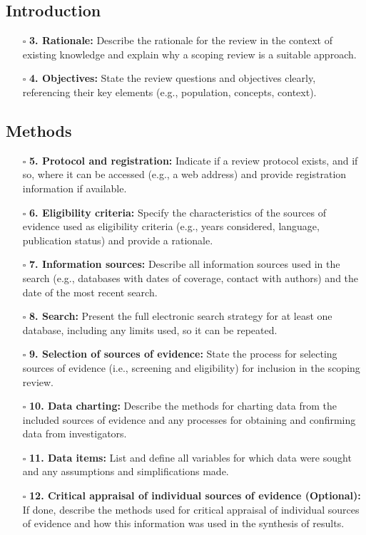 \documentclass[11pt]{article}
\def\tightlist{}
\begin{document}
\begin{Form}
\subsection{Introduction}\label{introduction}

\begin{itemize}
\tightlist
\item[$\square$]
  \textbf{3. Rationale:} Describe the rationale for the review in the
  context of existing knowledge and explain why a scoping review is a
  suitable approach.
\item[$\square$]
  \textbf{4. Objectives:} State the review questions and objectives
  clearly, referencing their key elements (e.g., population, concepts,
  context).
\end{itemize}

\subsection{Methods}\label{methods}

\begin{itemize}
\tightlist
\item[$\square$]
  \textbf{5. Protocol and registration:} Indicate if a review protocol
  exists, and if so, where it can be accessed (e.g., a web address) and
  provide registration information if available.
\item[$\square$]
  \textbf{6. Eligibility criteria:} Specify the characteristics of the
  sources of evidence used as eligibility criteria (e.g., years
  considered, language, publication status) and provide a rationale.
\item[$\square$]
  \textbf{7. Information sources:} Describe all information sources used
  in the search (e.g., databases with dates of coverage, contact with
  authors) and the date of the most recent search.
\item[$\square$]
  \textbf{8. Search:} Present the full electronic search strategy for at
  least one database, including any limits used, so it can be repeated.
\item[$\square$]
  \textbf{9. Selection of sources of evidence:} State the process for
  selecting sources of evidence (i.e., screening and eligibility) for
  inclusion in the scoping review.
\item[$\square$]
  \textbf{10. Data charting:} Describe the methods for charting data
  from the included sources of evidence and any processes for obtaining
  and confirming data from investigators.
\item[$\square$]
  \textbf{11. Data items:} List and define all variables for which data
  were sought and any assumptions and simplifications made.
\item[$\square$]
  \textbf{12. Critical appraisal of individual sources of evidence
  (Optional):} If done, describe the methods used for critical appraisal
  of individual sources of evidence and how this information was used in
  the synthesis of results.
\end{itemize}


\end{Form}
\end{document}
